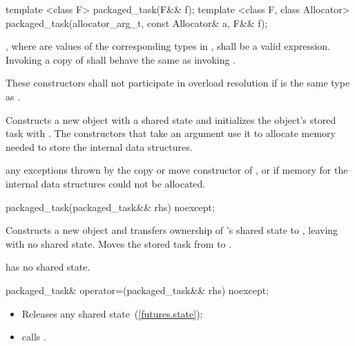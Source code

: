 %
\begin{itemdecl}
template <class F>
  packaged_task(F&& f);
template <class F, class Allocator>
  packaged_task(allocator_arg_t, const Allocator& a, F&& f);
\end{itemdecl}

\begin{itemdescr}
\pnum
\requires
{}, where  are values
of the corresponding types in , shall be a valid expression. Invoking
a copy of  shall behave the same as invoking .

\pnum
\remarks
These constructors shall not participate in overload resolution if 
is the same type as .

\pnum
\effects Constructs a new  object with a shared state and
initializes the object's stored task with . The constructors that
take an  argument use it to allocate memory needed to store the
internal data structures.

\pnum
\throws any exceptions thrown by the copy or move constructor of , or
 if memory for the internal data structures could not be
allocated.
\end{itemdescr}

%
\begin{itemdecl}
packaged_task(packaged_task&& rhs) noexcept;
\end{itemdecl}

\begin{itemdescr}
\pnum
\effects Constructs a new  object and transfers ownership of
's shared state to , leaving  with no
shared state. Moves the stored task from  to .

\pnum
\postcondition {} has no shared state.
\end{itemdescr}

%
%
\begin{itemdecl}
packaged_task& operator=(packaged_task&& rhs) noexcept;
\end{itemdecl}

\begin{itemdescr}
\pnum
\effects
\begin{itemize}
\item
Releases any shared state~(\ref{futures.state});
\item
calls .
\end{itemize}
\end{itemdescr}

